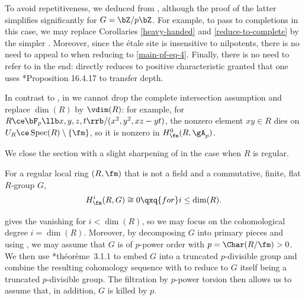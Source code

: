 \brem
To avoid repetitiveness, we deduced  from , although the proof of the latter simplifies significantly for $G = \bZ/p\bZ$. For example, to pass to completions in this case, we may replace Corollaries \ref{heavy-handed} and \ref{reduce-to-complete} by the simpler . Moreover, since the \'{e}tale site is insensitive to nilpotents, there is no need to appeal to  when reducing to \eqref{main-pf-eq-4}. Finally, there is no need to refer to  in the end:  directly reduces to positive characteristic granted that one uses \cite{GR18}*{Proposition 16.4.17} to transfer depth. %
\erem


\brem
In contrast to , in  we cannot drop the complete intersection assumption and replace $\dim(R)$ by $\vdim(R)$: for example, for $R \ce \bF_p\llb x, y, z, t\rrb/(x^2, y^2, xz - yt)$, the nonzero element $xy \in R$ dies on $U_R \ce \Spec(R)\setminus \{ \fm\}$, so it is nonzero in $H^0_\fm(R, \gA_p)$. %
\erem





We close the section with a slight sharpening of  in the case when $R$ is regular.

\bthm \label{thm:main-pf-regular}
For a regular local ring $(R, \fm)$ that is not a field and a commutative, finite, flat $R$-group $G$,
\[
H^i_\fm(R, G) \cong 0 \qxq{for} i \le \dim(R).
\]
\ethm

\bpf
{} gives the vanishing for $i < \dim(R)$, so we may focus on the cohomological degree $i = \dim(R)$. Moreover, by decomposing $G$ into primary pieces and using , we may assume that $G$ is of $p$-power order with $p = \Char(R/\fm) > 0$. We then use \cite{BBM82}*{th\'{e}or\`{e}me~3.1.1} to embed $G$ into a truncated $p$-divisible group and combine the resulting cohomology sequence with  to reduce to $G$ itself being a truncated $p$-divisible group. The filtration by $p$-power torsion then allows us to assume that, in addition, $G$ is killed by $p$.


